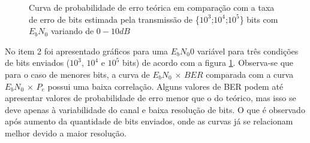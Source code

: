 \begin{figure}[H]
\begin{center}
         
\end{center}
\caption{Curva de probabilidade de erro teórica em comparação com a taxa de erro de bits estimada pela transmissão de \{$10^3$;$10^4$;$10^5$\} bits com $E_bN_0$ variando de $0-10dB$}
\label{fig:item2} 
\end{figure}

No item 2 foi apresentado gráficos para uma $E_bN_0$0 variável para três condições de bits enviados ($10^3$, $10^4$ e $10^5$ bits) de acordo com a figura \ref{fig:item2}. Observa-se que para o caso de menores bits, a curva de $E_bN_0 \, \times \, BER$ comparada com a curva  $E_bN_0 \, \times \, P_e$ possui uma baixa correlação. Alguns valores de BER podem até apresentar valores de probabilidade de erro menor que o do teórico, mas isso se deve apenas à variabilidade do canal e baixa resolução de bits. O que é observado após aumento da quantidade de bits enviados, onde as curvas já se relacionam melhor devido a maior resolução.